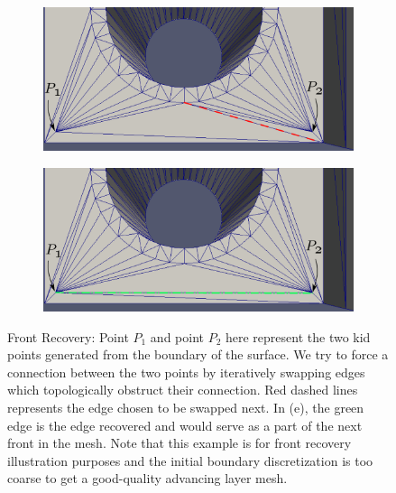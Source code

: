 \documentclass[conf]{new-aiaa}
\begin{document}
\begin{figure}[hbt!]
\begin{subfigure}{.4\textwidth}
  \includegraphics[width=.9\linewidth]{force-swapping-edge-recovery/swap3-edited.eps}
  \caption{}
  \label{force-swap4}
\end{subfigure}
\begin{subfigure}{.4\textwidth}
  \centering
  \includegraphics[width=.9\linewidth]{force-swapping-edge-recovery/swap4-edited.eps}
  \caption{}
  \label{force-swap5}
\end{subfigure}
\caption{Front Recovery: Point $P_1$ and point $P_2$ here represent the two kid points generated from the boundary of the surface. We try to force a connection between the two points by iteratively swapping edges which topologically obstruct their connection. Red dashed lines represents the edge chosen to be swapped next. In (e), the green edge is the edge recovered and would serve as a part of the next front in the mesh. Note that this example is for front recovery illustration purposes and the initial boundary discretization is too coarse to get a good-quality advancing layer mesh.}
\label{force-swap}
\end{figure}
\end{document}
